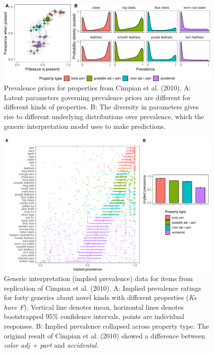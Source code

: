 \documentclass[floatsintext,man]{apa6}
\begin{document}
\begin{figure}
\centering
\includegraphics{genint_files/figure-latex/cimpian-prevPrior-1.pdf}
\caption{\label{fig:cimpian-prevPrior}Prevalence priors for properties from
Cimpian et al. (2010). A: Latent parameters governing prevalence priors
are different for different kinds of properties. B: The diversity in
parameters gives rise to different underlying distributions over
prevalence, which the generic interpretation model uses to make
predictions.}
\end{figure}


\begin{figure}
\centering
\includegraphics{figs/cimpian-results}
\caption{\label{fig:cimpian-modelingResults}Generic interpretation (implied prevalence) data for items from replication of Cimpian et al. (2010). A: Implied prevalence ratings for forty generics about novel kinds with different properties (\emph{Ks have F}). Vertical line denotes mean, horizontal lines denotes bootstrapped 95\% confidence intervals, points are individual responses. B: Implied prevalence collapsed across property type. The original result of Cimpian et al. (2010) showed a difference between \emph{color adj + part} and \emph{accidental}.}
\end{figure}
\end{document}
